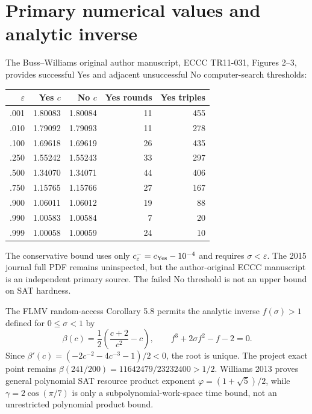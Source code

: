 \documentclass[11pt]{article}
\begin{document}
\section{Primary numerical values and analytic inverse}
The Buss--Williams original author manuscript, ECCC TR11-031,
Figures 2--3, provides successful Yes and adjacent unsuccessful
No computer-search thresholds:
\begin{center}\begin{tabular}{@{}rrrrr@{}}\toprule
$\varepsilon$&Yes $c$&No $c$&Yes rounds&Yes triples\\\midrule
.001&1.80083&1.80084&11&455\\
.010&1.79092&1.79093&11&278\\
.100&1.69618&1.69619&26&435\\
.250&1.55242&1.55243&33&297\\
.500&1.34070&1.34071&44&406\\
.750&1.15765&1.15766&27&167\\
.900&1.06011&1.06012&19&88\\
.990&1.00583&1.00584&7&20\\
.999&1.00058&1.00059&24&10\\\bottomrule
\end{tabular}\end{center}
The conservative bound uses only $c^-_\varepsilon=c_{\rm Yes}-10^{-4}$
and requires $\sigma<\varepsilon$. The 2015 journal full PDF
remains uninspected, but the author-original ECCC manuscript
is an independent primary source. The failed No threshold is
not an upper bound on SAT hardness.

The FLMV random-access Corollary 5.8 permits the analytic inverse
$f(\sigma)>1$ defined for $0\le\sigma<1$ by
\[
 \beta(c)=\frac12\left(\frac{c+2}{c^2}-c\right),\qquad
 f^3+2\sigma f^2-f-2=0.
\]
Since $\beta'(c)=(-2c^{-2}-4c^{-3}-1)/2<0$,
the root is unique. The project exact point remains
$\beta(241/200)=11642479/23232400>1/2$.
Williams 2013 proves general polynomial SAT resource
product exponent $\varphi=(1+\sqrt5)/2$, while
$\gamma=2\cos(\pi/7)$ is only a subpolynomial-work-space
time bound, not an unrestricted polynomial product bound.
\end{document}
